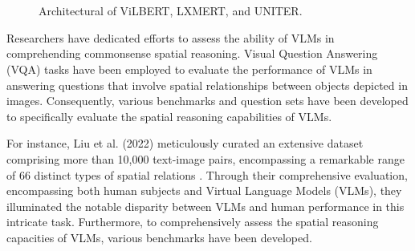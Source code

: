 \documentclass[journal,10pt]{IEEEtran}
\begin{document}
\begin{figure}[htbp]
    \centering
    \\
    \\
    \caption{Architectural of ViLBERT, LXMERT, and UNITER.}
    \label{fig:VLMs}
\end{figure}

Researchers have dedicated efforts to assess the ability of VLMs in comprehending commonsense spatial reasoning. Visual Question Answering (VQA) tasks have been employed to evaluate the performance of VLMs in answering questions that involve spatial relationships between objects depicted in images\cite{7410636}. Consequently, various benchmarks and question sets have been developed to specifically evaluate the spatial reasoning capabilities of VLMs.

For instance, Liu et al. (2022) meticulously curated an extensive dataset comprising more than 10,000 text-image pairs, encompassing a remarkable range of 66 distinct types of spatial relations \cite{liu2022visual}. Through their comprehensive evaluation, encompassing both human subjects and Virtual Language Models (VLMs), they illuminated the notable disparity between VLMs and human performance in this intricate task. Furthermore, to comprehensively assess the spatial reasoning capacities of VLMs, various benchmarks have been developed.
\end{document}
